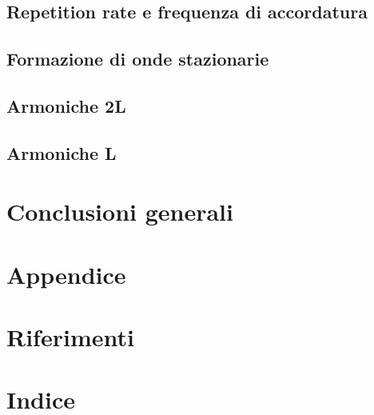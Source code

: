 \documentclass[journal]{IEEEtran}
\begin{document}
\subsection{Repetition rate e frequenza di accordatura}

\subsection{Formazione di onde stazionarie}

\subsection{Armoniche 2L}

\subsection{Armoniche L}

\section{Conclusioni generali} %


\section{Appendice}


\section{Riferimenti}
\printbibliography

\section{Indice}
\tableofcontents
\end{document}
